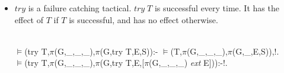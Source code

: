 \documentclass[11pt]{report}
\makeatletter
\newcommand{\ulinv}[1]{\index{#1@\texttt{#1}}}
\makeatother
\begin{document}
\begin{itemize}
  
 \item
 \ulinv{try}
 $try$ is a failure catching tactical.
 $try\; T$ is successful every time. It has the effect of $T$ 
 if $T$ is successful, and has no effect otherwise.
\begin{sf}\begin{tabbing}
\hspace{1em}\\[-0.15ex]
$\models$(try T,$\pi$(G,\_\hspace{0.1em},\_\hspace{0.1em},\_\hspace{0.1em}),$\pi$(G,try T,E,S)):- $\models$(T,$\pi$(G,\_\hspace{0.1em},\_\hspace{0.1em},\_\hspace{0.1em}),$\pi$(G,\_\hspace{0.1em},E,S)),!.\\[-0.15ex]
$\models$(try T,$\pi$(G,\_\hspace{0.1em},\_\hspace{0.1em},\_\hspace{0.1em}),$\pi$(G,try T,E,[$\pi$(G,\_\hspace{0.1em},\_\hspace{0.1em},\_\hspace{0.1em}) \mbox{\it ext} E])):-!.\\[-0.15ex]
\hspace{1em}
\end{tabbing}\end{sf}


\end{itemize}
\end{document}
